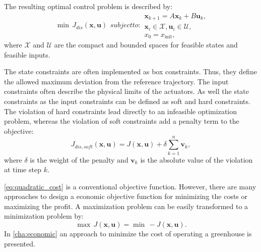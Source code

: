 The resulting optimal control problem is described by:
\begin{subequations} \label{eq:description_conventional_mpc}
\begin{align}
\min \, J_{dis}(\mathbf{x},\mathbf{u})
\end{align}
subject to:
\begin{align}
\mathbf{x}_{k+1} = A\mathbf{x}_k+B\mathbf{u}_k,\\
\mathbf{x}_i \in \mathcal{X}, \mathbf{u}_i  \in \mathcal{U},\\
x_0 = x_{\text{init}},
\end{align}
\end{subequations}
where $\mathcal{X}$ and $\mathcal{U}$ are the compact and bounded spaces for feasible states and feasible inputs.

The state constraints are often implemented as box constraints.
Thus, they define the allowed maximum deviation from the reference trajectory.
The input constraints often describe the physical limits of the actuators.
As well the state constraints as the input constraints can be defined as soft and hard constraints.
The violation of hard constraints lead directly to an infeasible optimization problem, whereas the violation of soft constraints add a penalty term to the objective:
\begin{equation}\label{eq:soft}
J_{dis,soft}(\mathbf{x},\mathbf{u}) = J(\mathbf{x},\mathbf{u}) + \delta \sum_{k=1}^{n} \mathbf{v}_k,
\end{equation}
where $\delta$ is the weight of the penalty and $\mathbf{v}_k$ is the absolute value of the violation at time step $k$.

\eqref{eq:quadratic_cost} is a conventional objective function.
However, there are many approaches to design a economic objective function for minimizing the costs or maximizing the profit. 
A maximization problem can be easily transformed to a minimization problem by:
\begin{equation}\label{eq:minmaxJ}
\max \, J(\mathbf{x},\mathbf{u}) = \min \, -J(\mathbf{x},\mathbf{u}).
\end{equation}
In \cref{cha:economic} an approach to minimize the cost of operating a greenhouse is presented.

